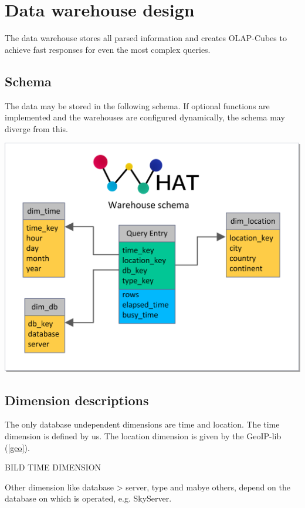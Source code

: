 \section{Data warehouse design}

The data warehouse stores all parsed information and creates OLAP-Cubes to achieve fast responses 
for even the most complex queries.

\subsection{Schema}
The data may be stored in the following schema. If optional functions are implemented and
the warehouses are configured dynamically, the schema may diverge from this.
\begin{center}
\includegraphics[width=1\linewidth]{Pictures/WHSchema2.png}
\end{center} 


\subsection{Dimension descriptions}
 The only database undependent dimensions are time and location. The time dimension is defined by us. The location 
 dimension is given by the GeoIP-lib (\ref{geo}).
 
 BILD TIME DIMENSION

Other dimension like database > server, type and mabye others, 
depend on the database on which is operated, e.g. SkyServer.



